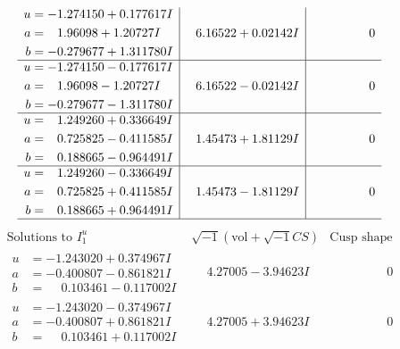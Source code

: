 \documentclass[1p]{elsarticle_modified}
\theoremstyle{definition}
\newcommand{\I}{\sqrt{-1}}
\begin{document}
$$\begin{array}{c|c|c}
\begin{aligned}
u &= -1.274150 + 0.177617 I \\
a &= \phantom{-}1.96098 + 1.20727 I \\
b &= -0.279677 + 1.311780 I\end{aligned}
 & \phantom{-}6.16522 + 0.02142 I & \phantom{-0.000000 } 0 \\ \hline\begin{aligned}
u &= -1.274150 - 0.177617 I \\
a &= \phantom{-}1.96098 - 1.20727 I \\
b &= -0.279677 - 1.311780 I\end{aligned}
 & \phantom{-}6.16522 - 0.02142 I & \phantom{-0.000000 } 0 \\ \hline\begin{aligned}
u &= \phantom{-}1.249260 + 0.336649 I \\
a &= \phantom{-}0.725825 - 0.411585 I \\
b &= \phantom{-}0.188665 - 0.964491 I\end{aligned}
 & \phantom{-}1.45473 + 1.81129 I & \phantom{-0.000000 } 0 \\ \hline\begin{aligned}
u &= \phantom{-}1.249260 - 0.336649 I \\
a &= \phantom{-}0.725825 + 0.411585 I \\
b &= \phantom{-}0.188665 + 0.964491 I\end{aligned}
 & \phantom{-}1.45473 - 1.81129 I & \phantom{-0.000000 } 0\\
 \hline 
 \end{array}$$\newpage$$\begin{array}{c|c|c}  
\text{Solutions to }I^u_{1}& \I (\text{vol} + \sqrt{-1}CS) & \text{Cusp shape}\\
 \hline 
\begin{aligned}
u &= -1.243020 + 0.374967 I \\
a &= -0.400807 - 0.861821 I \\
b &= \phantom{-}0.103461 - 0.117002 I\end{aligned}
 & \phantom{-}4.27005 - 3.94623 I & \phantom{-0.000000 } 0 \\ \hline\begin{aligned}
u &= -1.243020 - 0.374967 I \\
a &= -0.400807 + 0.861821 I \\
b &= \phantom{-}0.103461 + 0.117002 I\end{aligned}
 & \phantom{-}4.27005 + 3.94623 I & \phantom{-0.000000 } 0 \\ \hline\begin{aligned}

\end{aligned}
\end{array}$$
\end{document}
